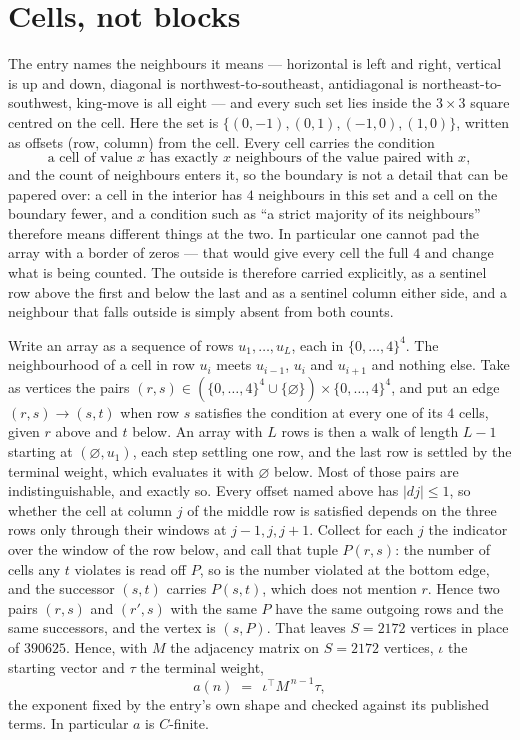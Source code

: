 \documentclass[11pt,a4paper]{article}
\theoremstyle{plain}
\theoremstyle{definition}
\begin{document}
\section{Cells, not blocks}

The entry names the neighbours it means --- horizontal is left and right, vertical is up and
down, diagonal is northwest-to-southeast, antidiagonal is northeast-to-southwest, king-move is
all eight --- and every such set lies inside the $3\times3$ square centred on the cell. Here
the set is $\{(0,-1), (0,1), (-1,0), (1,0)\}$, written as offsets (row, column) from the cell. Every cell carries
the condition
\[
\text{a cell of value }x\text{ has exactly }x\text{ neighbours of the value paired with }x,
\]
and the count of neighbours enters it, so the boundary is not a detail that can be papered
over: a cell in the interior has $4$ neighbours in this set and a cell on the boundary
fewer, and a condition such as ``a strict majority of its neighbours'' therefore means
different things at the two. In particular one cannot pad the array with a border of zeros ---
that would give every cell the full $4$ and change what is being counted. The outside is
therefore carried
explicitly, as a sentinel row above the first and below the last and as a sentinel column
either side, and a neighbour that falls outside is simply absent from both counts.

Write an array as a sequence of rows $u_1,\dots,u_L$, each in
$\{0,\dots,4\}^{4}$. The neighbourhood of a cell in row $u_i$ meets $u_{i-1}$,
$u_i$ and $u_{i+1}$ and nothing else. Take as vertices the pairs
$(r,s)\in(\{0,\dots,4\}^{4}\cup\{\varnothing\})\times\{0,\dots,4\}^{4}$,
and put an edge $(r,s)\to(s,t)$ when row $s$ satisfies the condition at every one of its
$4$ cells, given $r$ above and $t$ below. An array with $L$ rows is then a walk of length
$L-1$ starting at $(\varnothing,u_1)$, each step settling one row, and the last row is
settled by the terminal weight, which evaluates it with $\varnothing$ below. Most of those pairs are indistinguishable, and exactly so. Every offset named above has $|dj|\le 1$, so whether the cell at column $j$ of the middle row is satisfied depends on the three rows only through their windows at $j-1,j,j+1$. Collect for each $j$ the indicator over the window of the row below, and call that tuple $P(r,s)$: the number of cells any $t$ violates is read off $P$, so is the number violated at the bottom edge, and the successor $(s,t)$ carries $P(s,t)$, which does not mention $r$. Hence two pairs $(r,s)$ and $(r',s)$ with the same $P$ have the same outgoing rows and the same successors, and the vertex is $(s,P)$. That leaves $S=2172$ vertices in place of $390625$. Hence,
with $M$ the adjacency matrix on $S=2172$ vertices, $\iota$ the starting vector and $\tau$ the
terminal weight,
\[
a(n)\;=\;\,\iota^{\!\top}M^{\,n-1}\tau ,
\]
the exponent fixed by the entry's own shape and checked against its published terms. In
particular $a$ is $C$-finite.
\end{document}
